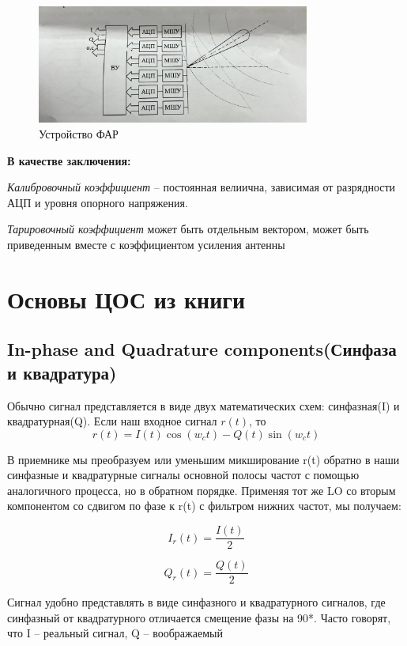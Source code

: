 \documentclass[14pt, report]{extarticle}
\begin{document}
\begin{figure}[h]
  \centering
  \includegraphics[width=0.8\textwidth]{../phased_array_antenna.jpg}
  \caption{Устройство ФАР}
\end{figure}

\textbf{В качестве заключения:} 

\par\textit{Калибровочный коэффициент} -- постоянная велиична, 
зависимая от разрядности АЦП и уровня опорного напряжения.
\par\textit{Тарировочный коэффициент} может быть отдельным вектором, 
может быть приведенным вместе с коэффициентом усиления антенны

\newpage
\section{Основы ЦОС из книги}
\subsection{In-phase and Quadrature components(Синфаза и квадратура)}

\par Обычно сигнал представляется в виде двух математических схем:
синфазная(I) и квадратурная(Q). Если наш входное сигнал $r(t)$, то 
\[
r(t) = I(t)\cos(w_c t) - Q(t)\sin(w_c t)
\]

\par В приемнике мы преобразуем или уменьшим микширование r(t) 
обратно в наши синфазные и квадратурные сигналы основной 
полосы частот с помощью аналогичного процесса, но в обратном порядке.
Применяя тот же LO со вторым компонентом со сдвигом по фазе к r(t)
с фильтром нижних частот, мы получаем:

\[
I_r(t) = \frac{I(t)}{2}
\]

\[
Q_r(t) = \frac{Q(t)}{2}
\]

\par Сигнал удобно представлять в виде синфазного и квадратурного сигналов,
где синфазный от квадратурного отличается смещение фазы на 90*. 
Часто говорят, что I -- реальный сигнал, Q -- воображаемый
\end{document}
